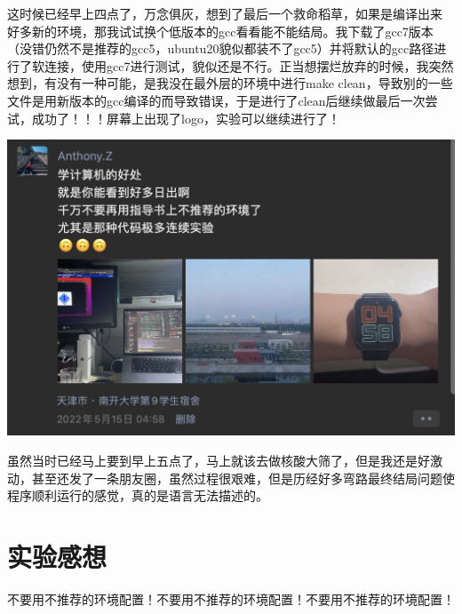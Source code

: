 \documentclass[UTF8,a4paper,10pt]{ctexart}
\begin{document}
这时候已经早上四点了，万念俱灰，想到了最后一个救命稻草，如果是编译出来 好多新的环境，那我试试换个低版本的gcc看看能不能结局。我下载了gcc7版本（没错仍然不是推荐的gcc5，ubuntu20貌似都装不了gcc5）并将默认的gcc路径进行了软连接，使用gcc7进行测试，貌似还是不行。正当想摆烂放弃的时候，我突然想到，有没有一种可能，是我没在最外层的环境中进行make clean，导致别的一些文件是用新版本的gcc编译的而导致错误，于是进行了clean后继续做最后一次尝试，成功了！！！屏幕上出现了logo，实验可以继续进行了！
\begin{center}
  \includegraphics*[scale=0.6]{pic/A}
\end{center}
虽然当时已经马上要到早上五点了，马上就该去做核酸大筛了，但是我还是好激动，甚至还发了一条朋友圈，虽然过程很艰难，但是历经好多弯路最终结局问题使程序顺利运行的感觉，真的是语言无法描述的。



\section{实验感想}
不要用不推荐的环境配置！不要用不推荐的环境配置！不要用不推荐的环境配置！
\end{document}
